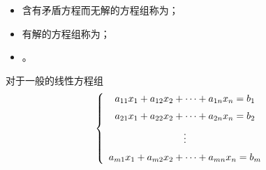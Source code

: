 \begin{itemize}
\item 含有矛盾方程而无解的方程组称为；
\item 有解的方程组称为；
\item {}。
\end{itemize}

对于一般的线性方程组
$$
\left\{
\begin{array}{c}
  a_{11}x_1 + a_{12}x_2 + \cdots + a_{1n}x_n = b_1\\[0.2cm]
  a_{21}x_1 + a_{22}x_2 + \cdots + a_{2n}x_n = b_2\\[0.2cm]
  \vdots\\[0.2cm]
  a_{m1}x_1 + a_{m2}x_2 + \cdots + a_{mn}x_n = b_m
\end{array}
\right.
$$

